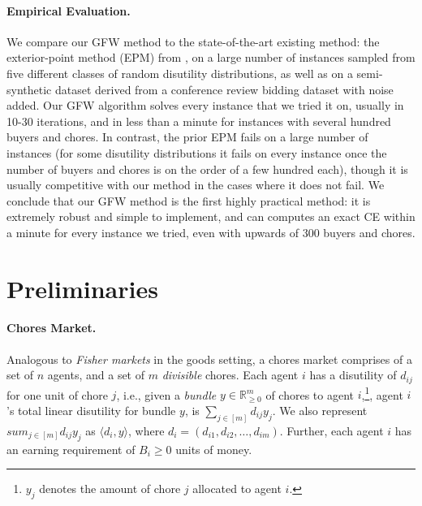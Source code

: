 \documentclass[format=acmsmall,authorversion]{acmart}
\newcommand{\ntl}[1]{{\textcolor{teal}{Tianlong: #1}}}
\begin{document}
\paragraph{Empirical Evaluation.} 
We compare our GFW method to the state-of-the-art existing method: the exterior-point method (EPM) from \citet{boodaghians2022polynomial}, on a large number of instances sampled from five different classes of random disutility distributions, as well as on a semi-synthetic dataset derived from a conference review bidding dataset with noise added.
Our GFW algorithm solves every instance that we tried it on, usually in 10-30 iterations, and in less than a minute for instances with several hundred buyers and chores. In contrast, the prior EPM fails on a large number of instances (for some disutility distributions it fails on every instance once the number of buyers and chores is on the order of a few hundred each), though it is usually competitive with our method in the cases where it does not fail.
We conclude that our GFW method is the first highly practical method: it is extremely robust and simple to implement, and can computes an exact CE within a minute for every instance we tried, even with upwards of 300 buyers and chores.








\section{Preliminaries}
\label{Sec:prelim}


\paragraph{Chores Market.} Analogous to \emph{Fisher markets} in the goods setting, a chores market comprises of a set of $n$ agents, and a set of $m$ \emph{divisible} chores. Each agent $i$ has a disutility of $d_{ij}$ for one unit of chore $j$, i.e., given a \emph{bundle} $y \in \mathbb{R}^m_{\geq 0}$ of chores to agent $i$,\footnote{$y_j$ denotes the amount of chore $j$ allocated to agent $i$.}, agent $i$'s total linear disutility for bundle $y$, is $\sum_{j \in [m]} d_{ij} y_j$. We also represent $sum_{j \in [m]} d_{ij} y_j$ as $\langle d_i, y \rangle$, where $d_i = (d_{i1}, d_{i2}, \dots, d_{im})$.  Further, each agent $i$ has an earning requirement of $B_i \geq 0$ units of money. 
\end{document}
